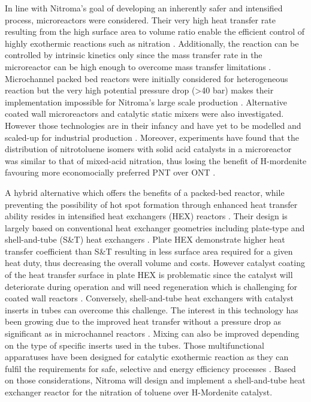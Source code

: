 In line with Nitroma's goal of developing an inherently safer and intensified process, microreactors were considered. Their very high heat transfer rate resulting from the high surface area to volume ratio enable the efficient control of highly exothermic reactions such as nitration \cite{halder_nitration_2007}. Additionally, the reaction can be controlled by intrinsic kinetics only since the mass transfer rate in the microreactor can be high enough to overcome mass transfer limitations \cite{halder_nitration_2007}. Microchannel packed bed reactors were initially considered for heterogeneous reaction but the very high potential pressure drop (>40 bar) makes their implementation impossible for Nitroma's large scale production \cite{rebrov_microreactors_2016}. Alternative coated wall microreactors and catalytic static mixers were also investigated. However those technologies are in their infancy and have yet to be modelled and scaled-up for industrial production \cite{lopes_regime_2013}. Moreover, experiments have found that the distribution of nitrotoluene isomers with solid acid catalysts in a microreactor was similar to that of mixed-acid nitration, thus losing the benefit of H-mordenite favouring more economocially preferred PNT over ONT \cite{halder_nitration_2007}.


A hybrid alternative which offers the benefits of a packed-bed reactor, while preventing the possibility of hot spot formation through enhanced heat transfer ability resides in intensified heat exchangers (HEX) reactors \cite{di_miceli_raimondi_safety_2015}. Their design is largely based on conventional heat exchanger geometries including plate-type and shell-and-tube (S\&T) heat exchangers \cite{anxionnaz_heat_2008}. Plate HEX demonstrate higher heat transfer coefficient than S\&T resulting in less surface area required for a given heat duty, thus decreasing the overall volume and costs. However catalyst coating of the heat transfer surface in plate HEX is problematic since the catalyst will deteriorate during operation and will need regeneration which is challenging for coated wall reactors \cite{anxionnaz_heat_2008}. Conversely, shell-and-tube heat exchangers with catalyst inserts in tubes can overcome this challenge. The interest in this technology has been growing due to the improved heat transfer without a pressure drop as significant as in microchannel reactors \cite{griffin_heat_2001}. Mixing can also be improved depending on the type of specific inserts used in the tubes. Those multifunctional apparatuses have been designed for catalytic exothermic reaction as they can fulfil the requirements for safe, selective and energy efficiency processes \cite{anxionnaz_heat_2008}. Based on those considerations, Nitroma will design and implement a shell-and-tube heat exchanger reactor for the nitration of toluene over H-Mordenite catalyst.



